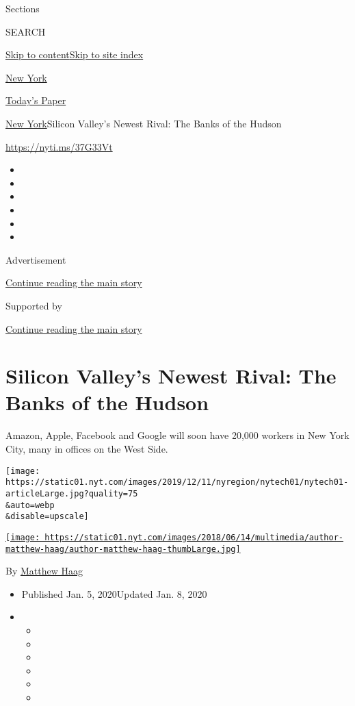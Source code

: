 Sections

SEARCH

\protect\hyperlink{site-content}{Skip to
content}\protect\hyperlink{site-index}{Skip to site index}

\href{https://www.nytimes.com/section/nyregion}{New York}

\href{https://myaccount.nytimes.com/auth/login?response_type=cookie\&client_id=vi}{}

\href{https://www.nytimes.com/section/todayspaper}{Today's Paper}

\href{/section/nyregion}{New York}\textbar{}Silicon Valley's Newest
Rival: The Banks of the Hudson

\url{https://nyti.ms/37G33Vt}

\begin{itemize}
\item
\item
\item
\item
\item
\item
\end{itemize}

Advertisement

\protect\hyperlink{after-top}{Continue reading the main story}

Supported by

\protect\hyperlink{after-sponsor}{Continue reading the main story}

\hypertarget{silicon-valleys-newest-rival-the-banks-of-the-hudson}{%
\section{Silicon Valley's Newest Rival: The Banks of the
Hudson}\label{silicon-valleys-newest-rival-the-banks-of-the-hudson}}

Amazon, Apple, Facebook and Google will soon have 20,000 workers in New
York City, many in offices on the West Side.

\texttt{[image: https://static01.nyt.com/images/2019/12/11/nyregion/nytech01/nytech01-articleLarge.jpg?quality=75\\\&auto=webp\\\&disable=upscale]}

\href{https://www.nytimes.com/by/matthew-haag}{\texttt{[image: https://static01.nyt.com/images/2018/06/14/multimedia/author-matthew-haag/author-matthew-haag-thumbLarge.jpg]}}

By \href{https://www.nytimes.com/by/matthew-haag}{Matthew Haag}

\begin{itemize}
\item
  Published Jan. 5, 2020Updated Jan. 8, 2020
\item
  \begin{itemize}
  \item
  \item
  \item
  \item
  \item
  \item
  \end{itemize}
\end{itemize}

